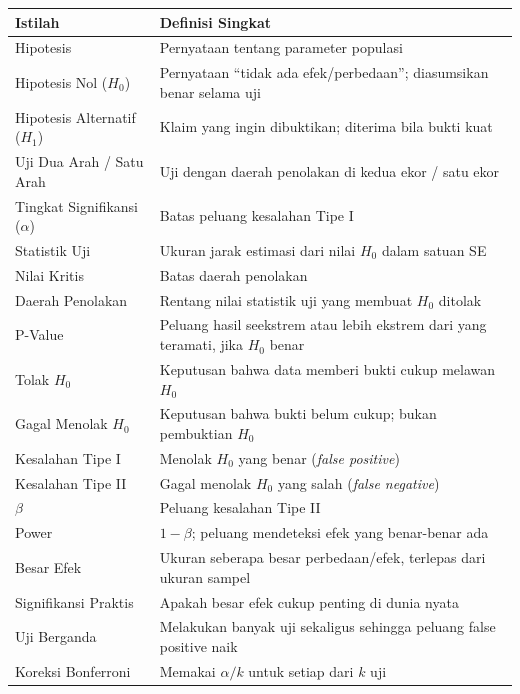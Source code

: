 \documentclass[
  indonesian,
  letterpaper,
]{book}
\newcounter{none} %
\begin{document}
{\def\LTcaptype{none} %
\begin{longtable}[]{@{}
  >{\raggedright\arraybackslash}p{}
  >{\raggedright\arraybackslash}p{}@{}}
\toprule\noalign{}
\begin{minipage}[b]{\linewidth}\raggedright
Istilah
\end{minipage} & \begin{minipage}[b]{\linewidth}\raggedright
Definisi Singkat
\end{minipage} \\
\midrule\noalign{}
\endhead
\bottomrule\noalign{}
\endlastfoot
Hipotesis & Pernyataan tentang parameter populasi \\
Hipotesis Nol (\(H_0\)) & Pernyataan ``tidak ada efek/perbedaan'';
diasumsikan benar selama uji \\
Hipotesis Alternatif (\(H_1\)) & Klaim yang ingin dibuktikan; diterima
bila bukti kuat \\
Uji Dua Arah / Satu Arah & Uji dengan daerah penolakan di kedua ekor /
satu ekor \\
Tingkat Signifikansi (\(\alpha\)) & Batas peluang kesalahan Tipe I \\
Statistik Uji & Ukuran jarak estimasi dari nilai \(H_0\) dalam satuan
SE \\
Nilai Kritis & Batas daerah penolakan \\
Daerah Penolakan & Rentang nilai statistik uji yang membuat \(H_0\)
ditolak \\
P-Value & Peluang hasil seekstrem atau lebih ekstrem dari yang teramati,
jika \(H_0\) benar \\
Tolak \(H_0\) & Keputusan bahwa data memberi bukti cukup melawan
\(H_0\) \\
Gagal Menolak \(H_0\) & Keputusan bahwa bukti belum cukup; bukan
pembuktian \(H_0\) \\
Kesalahan Tipe I & Menolak \(H_0\) yang benar (\emph{false positive}) \\
Kesalahan Tipe II & Gagal menolak \(H_0\) yang salah (\emph{false
negative}) \\
\(\beta\) & Peluang kesalahan Tipe II \\
Power & \(1 - \beta\); peluang mendeteksi efek yang benar-benar ada \\
Besar Efek & Ukuran seberapa besar perbedaan/efek, terlepas dari ukuran
sampel \\
Signifikansi Praktis & Apakah besar efek cukup penting di dunia nyata \\
Uji Berganda & Melakukan banyak uji sekaligus sehingga peluang false
positive naik \\
Koreksi Bonferroni & Memakai \(\alpha/k\) untuk setiap dari \(k\) uji \\
\end{longtable}
}
\end{document}
